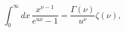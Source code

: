 \begin{equation}
\int _{0}^{\infty }dx\, \frac{x^{\nu -1}}{e^{ux}-1}=\frac{\Gamma \left(\nu \right)}{u^{\nu }}\zeta \left(\nu \right),\end{equation}

